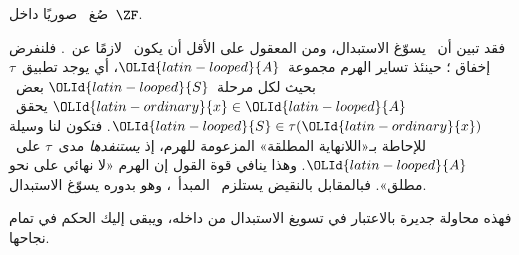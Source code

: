 \documentclass[../../../include/open-logic-section]{subfiles}
\begin{document}
\begin{prob}
	صُغ~\stagescofin{} صوريًا داخل~$\ZF$.
\end{prob}

فقد تبين أن~\stagescofin{} يسوّغ الاستبدال، ومن المعقول على الأقل أن
يكون~\stagescofin{} لازمًا عن~\stagesinex. فلنفرض إخفاق
\stagescofin؛ حينئذ تساير الهرم مجموعة~${\OLId{latin-looped}{A}}$، أي يوجد تطبيق~$\tau$
بحيث لكل مرحلة~${\OLId{latin-looped}{S}}$ بعض~${\OLId{latin-ordinary}{x}} \in {\OLId{latin-looped}{A}}$ يحقق~${\OLId{latin-looped}{S}} \in \tau({\OLId{latin-ordinary}{x}})$. فتكون لنا
وسيلة للإحاطة بـ«اللانهاية المطلقة» المزعومة للهرم، إذ \emph{يستنفدها}
مدى~$\tau$ على~${\OLId{latin-looped}{A}}$. وهذا ينافي قوة القول إن الهرم «لا نهائي على نحو
مطلق». فبالمقابل بالنقيض يستلزم~\stagesinex{} المبدأ~\stagescofin،
وهو بدوره يسوّغ الاستبدال.

فهذه محاولة جديرة بالاعتبار في تسويغ الاستبدال من داخله، ويبقى إليك
الحكم في تمام نجاحها.
\end{document}
